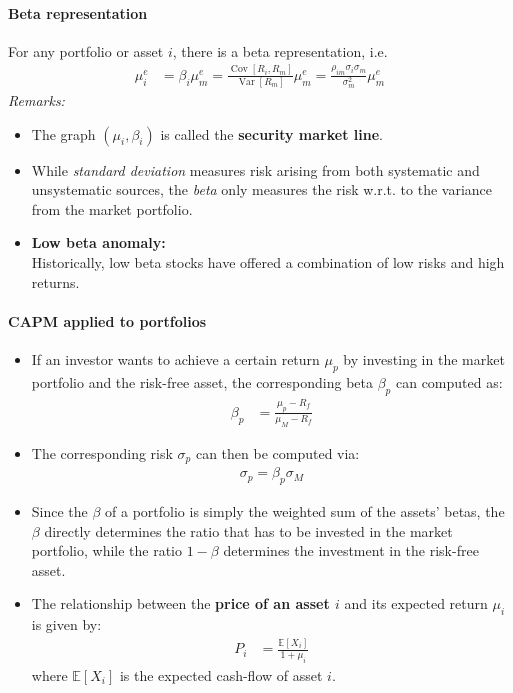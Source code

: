 \documentclass[a4paper,landscape,8pt,fleqn]{scrartcl}
\renewcommand{\emph}[1]{\textbf{#1}}
\DeclareMathOperator{\Var}{Var}				%
\DeclareMathOperator{\Cov}{Cov}				%
\begin{document}
\begin{multicols*}{3}
\paragraph{Beta representation}
For any portfolio or asset $i$, there is a beta representation, i.e.
\begin{align*}
\mu_i^e &= \beta_i \mu_m^e = \frac{\Cov[R_i,R_m]}{\Var[R_m]} \mu_m^e = \frac{\rho_{im} \sigma_i \sigma_m }{\sigma_m^2} \mu_m^e
\end{align*}
\textit{Remarks:}
\begin{itemize}
\item The graph $(\mu_i,\beta_i)$ is called the \emph{security market line}.
\item While \textit{standard deviation} measures risk arising from both systematic and unsystematic sources, the \textit{beta} only measures the risk w.r.t. to the variance from the market portfolio.
\item \emph{Low beta anomaly:} \\
Historically, low beta stocks have offered a combination of low risks and high returns.
\end{itemize}

\paragraph{CAPM applied to portfolios}
\begin{itemize}
\item If an investor wants to achieve a certain return $\mu_p$ by investing in the market portfolio and the risk-free asset, the corresponding beta $\beta_p$ can computed as:
\begin{align*}
\beta_p &= \frac{\mu_p - R_f}{\mu_M - R_f}
\end{align*}
\item The corresponding risk $\sigma_p$ can then be computed via:
\begin{align*}
\sigma_p = \beta_p \sigma_M
\end{align*}
\item Since the $\beta$ of a portfolio is simply the weighted sum of the assets' betas, the $\beta$ directly determines the ratio that has to be invested in the market portfolio, while the ratio $1-\beta$ determines the investment in the risk-free asset.
\item The relationship between the \emph{price of an asset $i$} and its expected return $\mu_i$ is given by:
\begin{align*}
P_i &= \frac{\mathbb{E}[X_i]}{1+\mu_i}
\end{align*}
where $\mathbb{E}[X_i]$ is the expected cash-flow of asset $i$.
\end{itemize}


\end{multicols*}
\end{document}
